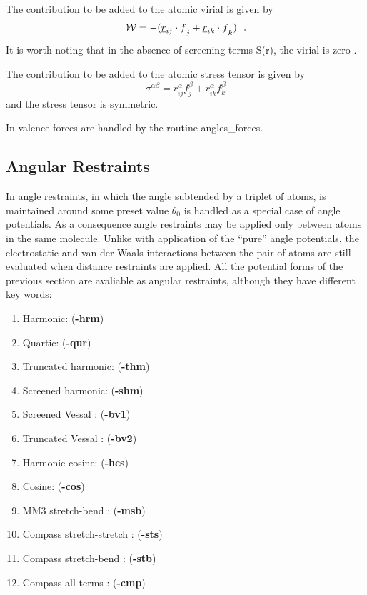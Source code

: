 The contribution to be added to the atomic virial is given by
\begin{equation}
{\cal W} = -(\mbox{$\underline{r}$}_{ij} \cdot \mbox{$\underline{f}$}_{j} + \mbox{$\underline{r}$}_{ik} \cdot
\mbox{$\underline{f}$}_{k})~~.
\end{equation}
It is worth noting that in the absence of screening terms S(r), the
virial is zero \cite{smith-93c}.

The contribution to be added to the atomic stress tensor is given by
\begin{equation}
\sigma^{\alpha \beta} = r_{ij}^{\alpha} f_{j}^{\beta} + r_{ik}^{\alpha} f_{k}^{\beta}
\end{equation}
and the stress tensor is symmetric.

In \D valence forces are handled by the routine {\sc
angles\_forces}.

\subsection{Angular Restraints}

In \D angle restraints, in which the angle subtended by a triplet
of atoms, is maintained around some preset value $\theta_{0}$ is
handled as a special case of angle potentials.  As a consequence
angle restraints may be applied only between atoms in the same
molecule.  Unlike with application of the ``pure'' angle
potentials, the electrostatic and
van der Waals interactions between
the pair of atoms are still evaluated when distance restraints are
applied.  All the potential forms of the previous section are
avaliable as angular restraints, although they have different key
words:

\begin{enumerate}
\item Harmonic:  ({\bf -hrm})
\item Quartic:  ({\bf -qur})
\item Truncated harmonic:  ({\bf -thm})
\item Screened harmonic:  ({\bf -shm})
\item Screened Vessal \cite{vessal-94a}:  ({\bf -bv1})
\item Truncated Vessal \cite{smith-95a}:  ({\bf -bv2})
\item Harmonic cosine:  ({\bf -hcs})
\item Cosine:  ({\bf -cos})
\item MM3 stretch-bend \cite{allinger-89a}:  ({\bf -msb})
\item Compass stretch-stretch \cite{sun-98}:  ({\bf -sts})
\item Compass stretch-bend \cite{sun-98}:  ({\bf -stb})
\item Compass all terms \cite{sun-98}:  ({\bf -cmp})
\end{enumerate}

